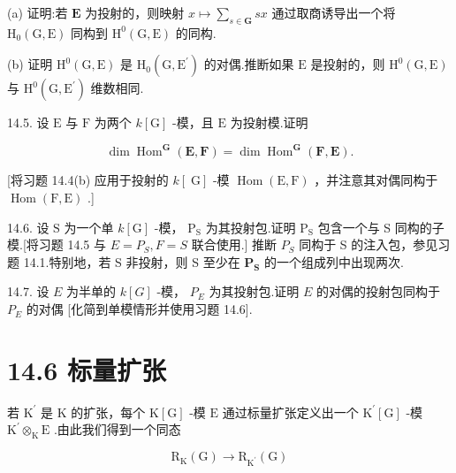 \documentclass[10pt]{article}
\begin{document}
(a) 证明:若 \(\mathbf{E}\) 为投射的，则映射 \(x \mapsto  \mathop{\sum }\limits_{{s \in  \mathbf{G}}}{sx}\) 通过取商诱导出一个将 \({\mathrm{H}}_{0}\left( {\mathrm{G},\mathrm{E}}\right)\) 同构到 \({\mathrm{H}}^{0}\left( {\mathrm{G},\mathrm{E}}\right)\) 的同构.

(b) 证明 \({\mathrm{H}}^{0}\left( {\mathrm{G},\mathrm{E}}\right)\) 是 \({\mathrm{H}}_{0}\left( {\mathrm{G},{\mathrm{E}}^{\prime }}\right)\) 的对偶.推断如果 \(\mathrm{E}\) 是投射的，则 \({\mathrm{H}}^{0}\left( {\mathrm{G},\mathrm{E}}\right)\) 与 \({\mathrm{H}}^{0}\left( {\mathrm{G},{\mathrm{E}}^{\prime }}\right)\) 维数相同.

14.5. 设 \(\mathrm{E}\) 与 \(\mathrm{F}\) 为两个 \(k\left\lbrack  \mathrm{G}\right\rbrack\) -模，且 \(\mathrm{E}\) 为投射模.证明

\[
\dim {\operatorname{Hom}}^{\mathbf{G}}\left( {\mathbf{E},\mathbf{F}}\right)  = \dim {\operatorname{Hom}}^{\mathbf{G}}\left( {\mathbf{F},\mathbf{E}}\right) .
\]

[将习题 14.4(b) 应用于投射的 \(k\left\lbrack  \mathrm{\;G}\right\rbrack\) -模 \(\operatorname{Hom}\left( {\mathrm{E},\mathrm{F}}\right)\) ，并注意其对偶同构于 \(\operatorname{Hom}\left( {\mathrm{F},\mathrm{E}}\right)\) .]

14.6. 设 \(\mathrm{S}\) 为一个单 \(k\left\lbrack  \mathrm{G}\right\rbrack\) -模， \({\mathrm{P}}_{\mathrm{S}}\) 为其投射包.证明 \({\mathrm{P}}_{\mathrm{S}}\) 包含一个与 S 同构的子模.[将习题 14.5 与 \(E = {P}_{S},F = S\) 联合使用.] 推断 \({P}_{S}\) 同构于 S 的注入包，参见习题 14.1.特别地，若 S 非投射，则 S 至少在 \({\mathbf{P}}_{\mathbf{S}}\) 的一个组成列中出现两次.

14.7. 设 \(E\) 为半单的 \(k\left\lbrack  G\right\rbrack\) -模， \({P}_{E}\) 为其投射包.证明 \(E\) 的对偶的投射包同构于 \({P}_{E}\) 的对偶 [化简到单模情形并使用习题 14.6].

\section*{14.6 标量扩张}

若 \({\mathrm{K}}^{\prime }\) 是 \(\mathrm{K}\) 的扩张，每个 \(\mathrm{K}\left\lbrack  \mathrm{G}\right\rbrack\) -模 \(\mathrm{E}\) 通过标量扩张定义出一个 \({\mathrm{K}}^{\prime }\left\lbrack  \mathrm{G}\right\rbrack\) -模 \({\mathrm{K}}^{\prime }{ \otimes  }_{\mathrm{K}}\mathrm{E}\) .由此我们得到一个同态

\[
{\mathrm{R}}_{\mathrm{K}}\left( \mathrm{G}\right)  \rightarrow  {\mathrm{R}}_{{\mathrm{K}}^{\prime }}\left( \mathrm{G}\right)
\]
\end{document}
